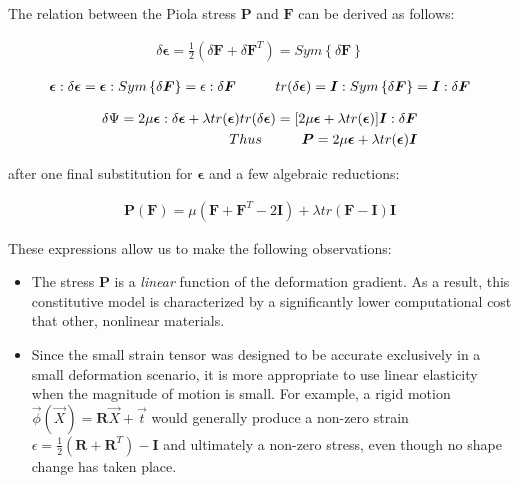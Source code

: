 The relation between the Piola stress $\mathbf{P}$ and $\mathbf{F}$ can be derived as follows:

\begin{align*}
\delta \boldsymbol{\epsilon} =\frac{1}{2}(\delta\mathbf{F} + \delta\mathbf{F}^T)=Sym\left\{\delta\mathbf{F}\right\}  
\end{align*}


\begin{align*}
\boldsymbol{\epsilon}:\delta\boldsymbol{\epsilon}=\boldsymbol{\epsilon}:Sym\left\{\delta\boldsymbol{F}\right\}=\epsilon:\delta\boldsymbol{F} \hspace{10 mm}
tr(\delta\boldsymbol{\epsilon})=\boldsymbol{I}:Sym\left\{\delta\boldsymbol{F}\right\}=\boldsymbol{I}:\delta\boldsymbol{F}
\end{align*}

\begin{align*}
\delta\Psi=2\mu\boldsymbol{\epsilon}:\delta\boldsymbol{\epsilon}+\lambda tr(\boldsymbol{\epsilon})  tr(\delta\boldsymbol{\epsilon})=[2\mu\boldsymbol{\epsilon}+\lambda tr(\boldsymbol{\epsilon})]\boldsymbol{I}:\delta\boldsymbol{F}\\
Thus \hspace{10 mm} \boldsymbol{P}=2\mu\boldsymbol{\epsilon}+\lambda tr(\boldsymbol{\epsilon})\boldsymbol{I}
\end{align*}

after one final substitution for $\boldsymbol{\epsilon}$ and a few algebraic reductions:

\begin{align*}
  \boldsymbol{P}(\boldsymbol{F})=\mu(\boldsymbol{F} + \boldsymbol{F}^T-2\boldsymbol{I})+\lambda tr(\boldsymbol{F} - \boldsymbol{I})\boldsymbol{I}
\end{align*}

These expressions allow us to make the following observations:

\begin{itemize}
 \item The stress $\boldsymbol{P}$ is a \textit{linear} function of the deformation gradient. As a result, this constitutive model is characterized by a significantly
lower computational cost that other, nonlinear materials. 

\item Since the small strain tensor was designed to be accurate exclusively in a small deformation scenario, it is more appropriate to use linear elasticity when the magnitude
of motion is small. For example, a rigid motion $\vec{\phi}(\vec{X})=\boldsymbol{R}\vec{X}+\vec{t}$ would generally produce a non-zero strain 
$\epsilon = \frac{1}{2}(\boldsymbol{R}+\boldsymbol{R}^T)-\boldsymbol{I}$ and ultimately a non-zero stress, even though no shape change has taken place. 
\end{itemize}

